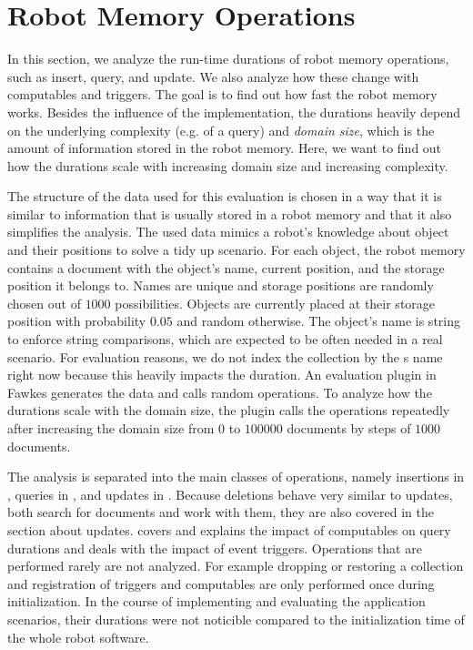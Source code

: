\section{Robot Memory Operations}
\label{sec:op-durations}
In this section, we analyze the run-time durations of robot memory
operations, such as insert, query, and update. We also analyze how
these change with computables and triggers. The goal is to find out
how fast the robot memory works. Besides the influence of the
implementation, the durations heavily depend on the underlying
complexity (e.g. of a query) and \emph{domain size}, which is the
amount of information stored in the robot memory. Here, we want to
find out how the durations scale with increasing domain size and
increasing complexity.

The structure of the data used for this evaluation is chosen in a way
that it is similar to information that is usually stored in a robot
memory and that it also simplifies the analysis. The used data mimics
a robot's knowledge about object and their positions to solve a tidy
up scenario. For each object, the robot memory contains a document
with the object's name, current position, and the storage position it
belongs to. Names are unique and storage positions are randomly chosen
out of $1000$ possibilities. Objects are currently placed at their
storage position with probability $0.05$ and random otherwise. The
object's name is string to enforce string comparisons, which are
expected to be often needed in a real scenario. For evaluation
reasons, we do not index the collection by the s name right now
because this heavily impacts the duration. An evaluation plugin in
Fawkes generates the data and calls random operations. To analyze how
the durations scale with the domain size, the plugin calls the
operations repeatedly after increasing the domain size from $0$ to
$100000$ documents by steps of $1000$ documents.

The analysis is separated into the main classes of operations, namely
insertions in , queries in
, and updates in . Because
deletions behave very similar to updates, both search for documents
and work with them, they are also covered in the section about
updates.  covers and explains the impact
of computables on query durations and  deals
with the impact of event triggers. Operations that are performed
rarely are not analyzed. For example dropping or restoring a collection and
registration of triggers and computables are only performed once
during initialization.  In the course of implementing and evaluating
the application scenarios, their durations were not noticible compared
to the initialization time of the whole robot software.

